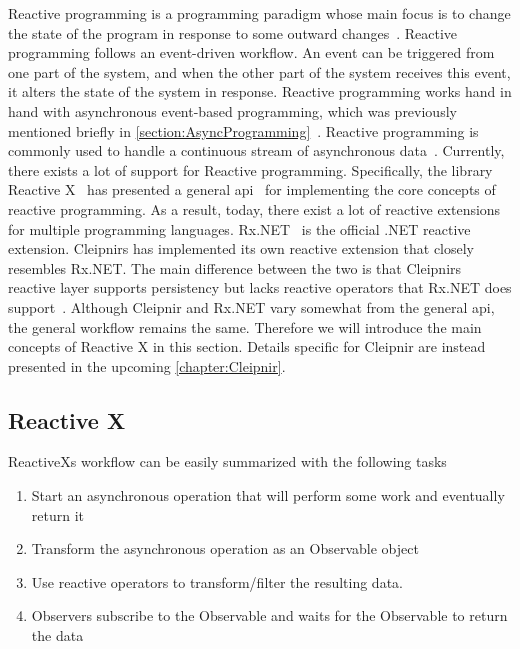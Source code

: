 \iffalse
-a brief introduce reactive programming
-usecase
-the ReactiveX library(what it does, how it works and the mention Rx.Net)
-give brief through workflow, concepts with name and definitions and how it works.(Observable, stream of data, subjects, event driven programming)
-mention briefly Cleipnir support for reactive programming, how they differ, say detail information is given in Cleipnir chapter.
\fi

Reactive programming is a programming paradigm whose main focus is to change the state of the program in response to some outward changes~\cite{WEB:RxProgIntro, DOC:Cleipnir}.
Reactive programming follows an event-driven workflow. An event can be triggered from one part of the system, and when the other part of the system receives this event, it alters the state of the system in response. Reactive programming works hand in hand with asynchronous event-based programming, which was previously mentioned briefly in \autoref{section:AsyncProgramming}~\cite[p.~2-3]{BOOK:RxLinq}. Reactive programming is commonly used to handle a continuous stream of asynchronous data~\cite{VIDEO:dotnetsheffReactive}. 
Currently, there exists a lot of support for Reactive programming. Specifically, the library Reactive X~\cite{WEB:ReactiveXMainPage} has presented a general \ac{api}~\cite{WEB:api} for implementing the core concepts of reactive programming. As a result, today, there exist a lot of reactive extensions for multiple programming languages. Rx.NET~\cite{Github:ReactiveExtensions} is the official .NET reactive extension. Cleipnirs has implemented its own reactive extension that closely resembles  Rx.NET. The main difference between the two is that Cleipnirs reactive layer supports persistency but lacks reactive operators that Rx.NET does support~\cite{DOC:Cleipnir}.
Although Cleipnir and Rx.NET vary somewhat from the general \ac{api}, the general workflow remains the same. Therefore we will introduce the main concepts of Reactive X in this section. Details specific for Cleipnir are instead presented in the upcoming \autoref{chapter:Cleipnir}.

\subsection{Reactive X}
ReactiveXs workflow can be easily summarized with the following tasks~\cite{WEB:ReactiveObservable}
\begin{enumerate}
	\item{Start an asynchronous operation that will perform some work and eventually return it}
	\item{Transform the asynchronous operation as an Observable object}
	\item{Use reactive operators to transform/filter the resulting data.}
	\item{Observers subscribe to the Observable and waits for the Observable to return the data}
\end{enumerate}

